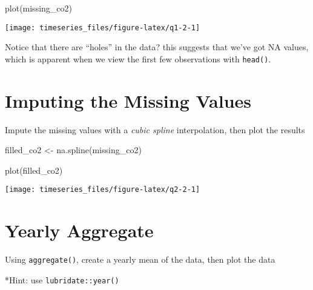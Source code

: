 \documentclass[
]{book}
\newenvironment{Shaded}{\begin{snugshade}}{\end{snugshade}}
\newcommand{\FunctionTok}[1]{\textcolor[rgb]{0.00,0.00,0.00}{#1}}
\newcommand{\NormalTok}[1]{#1}
\newcommand{\OtherTok}[1]{\textcolor[rgb]{0.56,0.35,0.01}{#1}}
\begin{document}
\begin{Shaded}
\begin{Highlighting}[]
\FunctionTok{plot}\NormalTok{(missing\_co2)}
\end{Highlighting}
\end{Shaded}

\begin{center}\texttt{[image: timeseries\_files/figure-latex/q1-2-1]} \end{center}

Notice that there are ``holes'' in the data? this suggests that we've got NA values, which is apparent when we view the first few observations with \texttt{head()}.

\newpage

\hypertarget{imputing-the-missing-values}{%
\section{Imputing the Missing Values}\label{imputing-the-missing-values}}

Impute the missing values with a \emph{cubic spline} interpolation, then plot the results

\begin{Shaded}
\begin{Highlighting}[]
\NormalTok{filled\_co2 }\OtherTok{\textless{}{-}} \FunctionTok{na.spline}\NormalTok{(missing\_co2)}
\end{Highlighting}
\end{Shaded}

\begin{Shaded}
\begin{Highlighting}[]
\FunctionTok{plot}\NormalTok{(filled\_co2)}
\end{Highlighting}
\end{Shaded}

\begin{center}\texttt{[image: timeseries\_files/figure-latex/q2-2-1]} \end{center}

\newpage

\hypertarget{yearly-aggregate}{%
\section{Yearly Aggregate}\label{yearly-aggregate}}

Using \texttt{aggregate()}, create a yearly mean of the data, then plot the data

*Hint: use \texttt{lubridate::year()}
\end{document}
